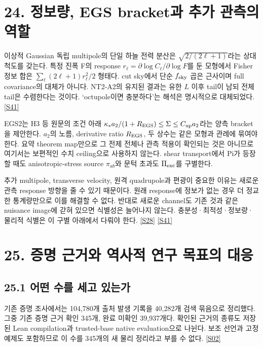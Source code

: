 \documentclass[11pt,a4paper]{article}
\begin{document}
\hypertarget{s24}{}

\section*{24. 정보량, EGS bracket과 추가 관측의 역할}


이상적 Gaussian 독립 multipole의 단일 하늘 전력 분산은 \(\sqrt{2/(2\ell+1)}\)라는 상대 척도를 갖는다. 특정 진폭 F의 response \(r_\ell=\partial\log C_\ell/\partial\log F\)를 둔 모형에서 Fisher 정보 합은 \(\sum_\ell (2\ell+1)r_\ell^2/2\) 형태다. cut sky에서 단순 \(f_{\rm sky}\) 곱은 근사이며 full covariance의 대체가 아니다. NT2-A2의 유지된 결과는 유한 \(L\) 이후 tail이 남되 전체 tail은 수렴한다는 것이다. ‘octupole이면 충분하다’는 해석은 명시적으로 대체되었다. \hyperlink{src:S41}{[S41]}


EGS2는 H3 등 원문의 조건 아래 \(\kappa_* a_2/(1+R_{\rm EGS})\le\Sigma\le C_{\rm up}a_2\)라는 양측 bracket을 제안한다. \(a_2\)의 노름, derivative ratio \(R_{\rm EGS}\), 두 상수는 같은 모형과 관례에 묶여야 한다. 요약 theorem map만으로 그 전제 전체나 관측 적용이 확인되는 것은 아니므로 여기서는 보편적인 수치 ceiling으로 사용하지 않는다. shear transport에서 Pi가 등장할 때도 anisotropic-stress source \(\pi_{ab}\)와 문턱 초과도 \(\Pi_{\rm exc}\)를 구별한다.


추가 multipole, transverse velocity, 원격 quadrupole과 편광이 중요한 이유는 새로운 관측 response 방향을 줄 수 있기 때문이다. 원래 response에 정보가 없는 경우 더 정교한 통계량만으로 이를 해결할 수 없다. 반대로 새로운 channel도 기존 것과 같은 nuisance image에 갇혀 있으면 식별성은 늘어나지 않는다. 충분성·최적성·정보량·물리적 식별은 이 구별 아래에서 다뤄야 한다. \hyperlink{src:S28}{[S28]} \hyperlink{src:S41}{[S41]}


\hypertarget{s25}{}

\section*{25. 증명 근거와 역사적 연구 목표의 대응}


\subsection*{25.1 어떤 수를 세고 있는가}

기존 증명 조사에서는 104,780개 출처 발생 기록을 40,282개 검색 묶음으로 정리했다. 그중 기존 증명 근거 확인 345개, 완료 미확인 39,937개다. 확인된 근거의 종류도 저장된 Lean compilation과 trusted-base native evaluation으로 나뉜다. 보조 선언과 고정 예제도 포함하므로 이 수를 345개의 새 물리 정리라고 부를 수 없다. \hyperlink{src:S02}{[S02]}
\end{document}
